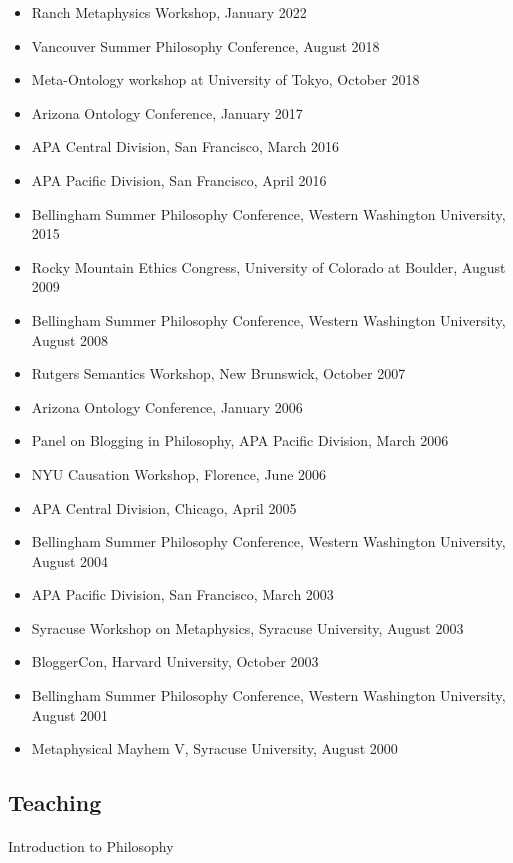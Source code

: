 \documentclass[
  10pt,
  letterpaper,
  DIV=11,
  numbers=noendperiod,
  twoside]{scrartcl}
\makeatletter
\let\oldparagraph\paragraph
\renewcommand{\paragraph}{
    \@ifstar
      \xxxParagraphStar
      \xxxParagraphNoStar
  }
\newcommand{\xxxParagraphStar}[1]{\oldparagraph*{#1}\mbox{}}
\newcommand{\xxxParagraphNoStar}[1]{\oldparagraph{#1}\mbox{}}
\providecommand{\tightlist}{%
  \setlength{\itemsep}{0pt}\setlength{\parskip}{0pt}}
\makeatother
\begin{document}
\begin{itemize}
\tightlist
\item
  Ranch Metaphysics Workshop, January 2022
\item
  Vancouver Summer Philosophy Conference, August 2018
\item
  Meta-Ontology workshop at University of Tokyo, October 2018
\item
  Arizona Ontology Conference, January 2017
\item
  APA Central Division, San Francisco, March 2016
\item
  APA Pacific Division, San Francisco, April 2016
\item
  Bellingham Summer Philosophy Conference, Western Washington
  University, 2015
\item
  Rocky Mountain Ethics Congress, University of Colorado at Boulder,
  August 2009
\item
  Bellingham Summer Philosophy Conference, Western Washington
  University, August 2008
\item
  Rutgers Semantics Workshop, New Brunswick, October 2007
\item
  Arizona Ontology Conference, January 2006
\item
  Panel on Blogging in Philosophy, APA Pacific Division, March 2006
\item
  NYU Causation Workshop, Florence, June 2006
\item
  APA Central Division, Chicago, April 2005
\item
  Bellingham Summer Philosophy Conference, Western Washington
  University, August 2004
\item
  APA Pacific Division, San Francisco, March 2003
\item
  Syracuse Workshop on Metaphysics, Syracuse University, August 2003
\item
  BloggerCon, Harvard University, October 2003
\item
  Bellingham Summer Philosophy Conference, Western Washington
  University, August 2001
\item
  Metaphysical Mayhem V, Syracuse University, August 2000
\end{itemize}

\subsection{Teaching}\label{teaching}

\paragraph{Introduction to Philosophy}\label{introduction-to-philosophy}
\end{document}
